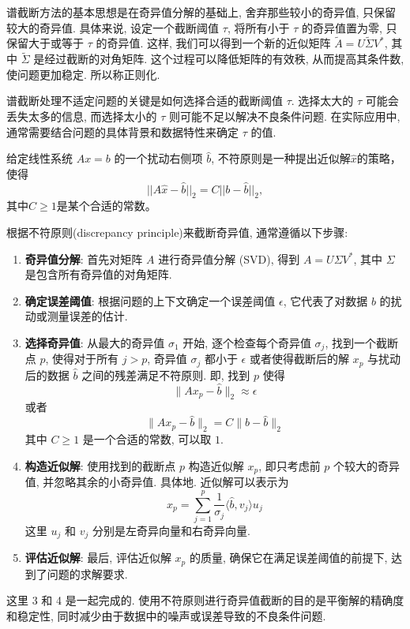 \documentclass[a4paper]{ctexart}
\newcommand{\hl}[1]
{\noindent {\bf {#1}}}
\begin{document}
{谱截断方法的基本思想是在奇异值分解的基础上, 舍弃那些较小的奇异值, 只保留较大的奇异值. 
具体来说, 设定一个截断阈值 $\tau$, 将所有小于 $\tau$ 的奇异值置为零, 
只保留大于或等于 $\tau$ 的奇异值. 这样, 我们可以得到一个新的近似矩阵 
$\tilde{A} = U\tilde{\Sigma} V^*$, 其中 $\tilde{\Sigma}$ 是经过截断的对角矩阵. 
这个过程可以降低矩阵的有效秩, 从而提高其条件数, 使问题更加稳定. 所以称正则化.

谱截断处理不适定问题的关键是如何选择合适的截断阈值 $\tau$. 
选择太大的 $\tau$ 可能会丢失太多的信息, 而选择太小的 $\tau$ 则可能不足以解决不良条件问题. 
在实际应用中, 通常需要结合问题的具体背景和数据特性来确定 $\tau$ 的值. 

\hl{定义5.64} 给定线性系统 $Ax = b$ 的一个扰动右侧项 $\hat{b}$, 
不符原则是一种提出近似解$\hat{x}$的策略，使得
\[ ||A\hat{x} - \hat{b}||_2 = C||b - \hat{b}||_2, \]
其中$C \geq 1$是某个合适的常数。

根据不符原则(discrepancy principle)来截断奇异值, 通常遵循以下步骤:

\begin{enumerate}
  \item {\bf 奇异值分解}: 首先对矩阵 $A$ 进行奇异值分解 (SVD), 
  得到 $A = U\Sigma V^*$, 其中 $\Sigma$ 是包含所有奇异值的对角矩阵. 
  \item {\bf 确定误差阈值}: 根据问题的上下文确定一个误差阈值 $\epsilon$, 
  它代表了对数据 $b$ 的扰动或测量误差的估计. 
  \item {\bf 选择奇异值}: 从最大的奇异值 $\sigma_1$ 开始, 
  逐个检查每个奇异值 $\sigma_j$, 找到一个截断点 $p$, 使得对于所有 $j > p$, 
  奇异值 $\sigma_j$ 都小于 $\epsilon$ 或者使得截断后的解 $x_p$ 与扰动后的数据
  $\hat{b}$ 之间的残差满足不符原则. 即, 找到 $p$ 使得
  \[ 
  \|A x_p - \hat{b}\|_2 \approx \epsilon 
  \]
  或者
  \[ 
  \|A x_p - \hat{b}\|_2 = C \|b - \hat{b}\|_2 
  \]
  其中 $C \geq 1$ 是一个合适的常数, 可以取 $1$.
  \item {\bf 构造近似解}: 使用找到的截断点 $p$ 构造近似解 $x_p$, 
  即只考虑前 $p$ 个较大的奇异值, 并忽略其余的小奇异值. 具体地. 近似解可以表示为
  \[ 
  x_p = \sum_{j=1}^{p} \frac{1}{\sigma_j} \langle \hat{b}, v_j \rangle u_j 
  \]
  这里 $u_j$ 和 $v_j$ 分别是左奇异向量和右奇异向量.
  \item {\bf 评估近似解}: 最后, 评估近似解 $x_p$ 的质量, 确保它在满足误差阈值的前提下, 
  达到了问题的求解要求.
\end{enumerate}

这里 3 和 4 是一起完成的. 使用不符原则进行奇异值截断的目的是平衡解的精确度和稳定性, 
同时减少由于数据中的噪声或误差导致的不良条件问题. 

}
\end{document}
